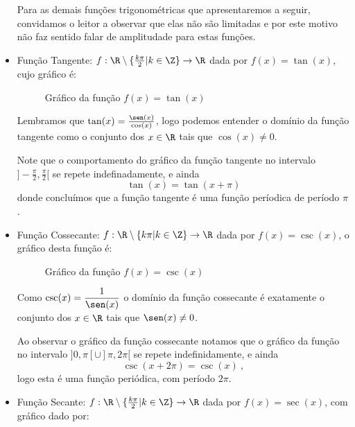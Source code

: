 \begin{itemize}
  Para as demais funções trigonométricas que apresentaremos a seguir, convidamos o leitor a observar que elas não são limitadas e por este motivo não faz sentido falar de amplitudade para estas funções.

  \item Função Tangente: $f: \R \setminus \{\frac{k\pi}{2} | k \in \Z\} \rightarrow \R$ dada por $f(x)= \tan(x)$, cujo gráfico é:

  \begin{figure}[H]
  \centering
    \caption{Gráfico da função $f(x)= \tan (x)$}
  \end{figure}

  Lembramos que $\tan(x)= \frac{\sen(x)}{\cos(x)}$, logo podemos entender o domínio da função tangente como o conjunto dos $x \in \R$ tais que $\cos(x) \neq 0$.

  Note que o comportamento do gráfico da função tangente no intervalo $]-\frac{\pi}{2}, \frac{\pi}{2}[$ se repete indefinadamente, e ainda
\begin{equation}
\tan(x)= \tan(x + \pi)
\end{equation}
  donde concluímos que a função tangente é uma função períodica de período $\pi$.

  \item Função Cossecante: $f: \R \setminus \{ k\pi | k \in \Z\} \rightarrow \R$ dada por $f(x)= \csc(x)$, o gráfico desta função é:

  \begin{figure}[H]
  \centering
    \caption{Gráfico da função $f(x)= \csc(x)$}
  \end{figure}

  Como $\csc(x)= \dfrac{1}{\sen(x)}$ o domínio da função cossecante é exatamente o conjunto dos $x \in \R$ tais que $\sen(x) \neq 0$.

  Ao observar o gráfico da função cossecante notamos que o gráfico da função no intervalo $]0, \pi[ \cup ] \pi, 2 \pi[$ se repete indefinidamente, e ainda
\begin{equation}
\csc(x + 2\pi)= \csc(x) \ , 
\end{equation}
  logo esta é uma função periódica, com período $2\pi$.

  \item Função Secante: $f: \R \setminus \{\frac{k\pi}{2} | k \in \Z\} \rightarrow \R$ dada por $f(x)= \sec(x)$, com gráfico dado por:


\end{itemize}
